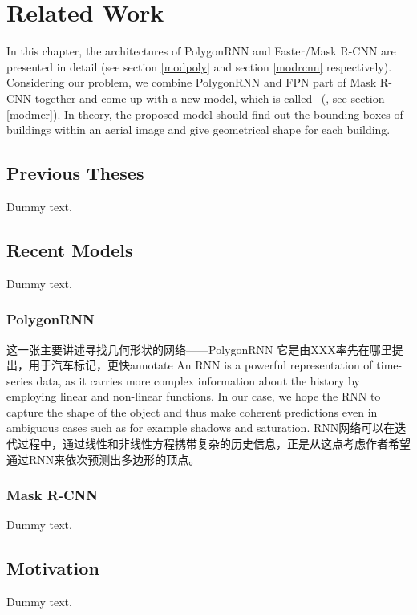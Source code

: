 \chapter{Related Work}

In this chapter, the architectures of PolygonRNN and Faster/Mask R-CNN are presented in detail (see section \ref{modpoly} and section \ref{modrcnn} respectively). Considering our problem, we combine PolygonRNN and FPN part of Mask R-CNN together and come up with a new model, which is called \modelnameshort\ (\modelnamelong, see section \ref{modmer}). In theory, the proposed model should find out the bounding boxes of buildings within an aerial image and give geometrical shape for each building.

\section{Previous Theses}

Dummy text.

\section{Recent Models}

Dummy text.

\subsection{PolygonRNN}\label{relatpoly}

这一张主要讲述寻找几何形状的网络——PolygonRNN
它是由XXX率先在哪里提出，用于汽车标记，更快annotate
An RNN is a powerful representation of time-series data, as it carries more complex information about the history by employing linear and non-linear functions. In our case, we hope the RNN to capture the shape of the object and thus make coherent predictions even in ambiguous cases such as for example shadows and saturation.
RNN网络可以在迭代过程中，通过线性和非线性方程携带复杂的历史信息，正是从这点考虑作者希望通过RNN来依次预测出多边形的顶点。

\subsection{Mask R-CNN}

Dummy text.

\section{Motivation}

Dummy text.
